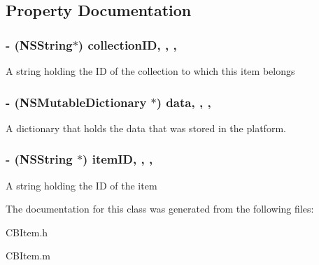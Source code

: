 \subsection{Property Documentation}
\hypertarget{interface_c_b_item_a8d47dba1bcfeb0754b65d312a48a939a}{
\subsubsection[{collection\+I\+D}]{\setlength{\rightskip}{0pt plus 5cm}-\/ (N\+S\+String$\ast$) collection\+I\+D\hspace{0.3cm}{\ttfamily [read]}, {\ttfamily [write]}, {\ttfamily [nonatomic]}, {\ttfamily [strong]}}}\label{interface_c_b_item_a8d47dba1bcfeb0754b65d312a48a939a}
A string holding the I\+D of the collection to which this item belongs \hypertarget{interface_c_b_item_a056a3d35cb718cb306dc69915bec29e2}{
\subsubsection[{data}]{\setlength{\rightskip}{0pt plus 5cm}-\/ (N\+S\+Mutable\+Dictionary $\ast$) data\hspace{0.3cm}{\ttfamily [read]}, {\ttfamily [write]}, {\ttfamily [nonatomic]}, {\ttfamily [strong]}}}\label{interface_c_b_item_a056a3d35cb718cb306dc69915bec29e2}
A dictionary that holds the data that was stored in the platform. \hypertarget{interface_c_b_item_adc7d0932fa46e75354e7dbe63d714165}{
\subsubsection[{item\+I\+D}]{\setlength{\rightskip}{0pt plus 5cm}-\/ (N\+S\+String $\ast$) item\+I\+D\hspace{0.3cm}{\ttfamily [read]}, {\ttfamily [write]}, {\ttfamily [nonatomic]}, {\ttfamily [strong]}}}\label{interface_c_b_item_adc7d0932fa46e75354e7dbe63d714165}
A string holding the I\+D of the item 

The documentation for this class was generated from the following files\+:\begin{DoxyCompactItemize}
\item 
C\+B\+Item.\+h\item 
C\+B\+Item.\+m\end{DoxyCompactItemize}
